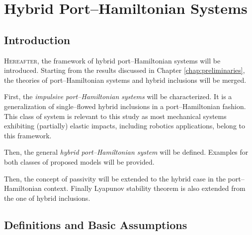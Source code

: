 \chapter{Hybrid Port--Hamiltonian Systems}

\label{chap:HPH_systems}
\minitoc

\thispagestyle{empty}

\newpage
\section{Introduction}
\lettrine[lines=4]{\color{brickred}H}{ereafter}, the framework of hybrid port--Hamiltonian systems will be introduced. Starting from the results discussed in Chapter \ref{chap:preliminaries}, the theories of port--Hamiltonian systems and hybrid inclusions will be merged. 
%
\newline

%
First, the \textit{impulsive port--Hamiltonian systems} will be characterized. It is a generalization of single--flowed hybrid inclusions in a port--Hamiltonian fashion. This class of system is relevant to this study as most mechanical systems exhibiting (partially) elastic impacts, including robotics applications, belong to this framework. 
%
\newline

%
Then, the general \textit{hybrid port--Hamiltonian system} will be defined. Examples for both classes of proposed models will be provided.
%
\newline

%
Then, the concept of passivity will be extended to the hybrid case in the port--Hamiltonian context. Finally Lyapunov stability theorem is also extended from the one of hybrid inclusions. 
%
\clearpage
\section{Definitions and Basic Assumptions}
